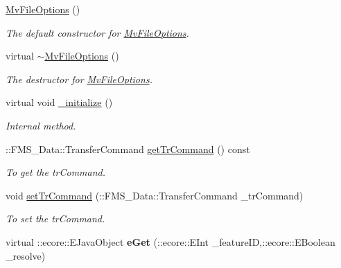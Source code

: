 \begin{DoxyCompactItemize}
\item 
\hypertarget{classFMS__Data_1_1MvFileOptions_a2418ac363bd5649b573cc92597c03cc5}{
\hyperlink{classFMS__Data_1_1MvFileOptions_a2418ac363bd5649b573cc92597c03cc5}{MvFileOptions} ()}
\label{classFMS__Data_1_1MvFileOptions_a2418ac363bd5649b573cc92597c03cc5}

\begin{DoxyCompactList}\small\item\em The default constructor for \hyperlink{classFMS__Data_1_1MvFileOptions}{MvFileOptions}. \item\end{DoxyCompactList}\item 
\hypertarget{classFMS__Data_1_1MvFileOptions_a7e2f6250a0c32a31f6e522e785bd1e5e}{
virtual \hyperlink{classFMS__Data_1_1MvFileOptions_a7e2f6250a0c32a31f6e522e785bd1e5e}{$\sim$MvFileOptions} ()}
\label{classFMS__Data_1_1MvFileOptions_a7e2f6250a0c32a31f6e522e785bd1e5e}

\begin{DoxyCompactList}\small\item\em The destructor for \hyperlink{classFMS__Data_1_1MvFileOptions}{MvFileOptions}. \item\end{DoxyCompactList}\item 
\hypertarget{classFMS__Data_1_1MvFileOptions_a0aee099d31f86c16911b06b20671326b}{
virtual void \hyperlink{classFMS__Data_1_1MvFileOptions_a0aee099d31f86c16911b06b20671326b}{\_\-initialize} ()}
\label{classFMS__Data_1_1MvFileOptions_a0aee099d31f86c16911b06b20671326b}

\begin{DoxyCompactList}\small\item\em Internal method. \item\end{DoxyCompactList}\item 
::FMS\_\-Data::TransferCommand \hyperlink{classFMS__Data_1_1MvFileOptions_a000cae44e75d374994afd9522d06db7a}{getTrCommand} () const 
\begin{DoxyCompactList}\small\item\em To get the trCommand. \item\end{DoxyCompactList}\item 
void \hyperlink{classFMS__Data_1_1MvFileOptions_ac46c0b66b2f78ee5fc51177b22e59c27}{setTrCommand} (::FMS\_\-Data::TransferCommand \_\-trCommand)
\begin{DoxyCompactList}\small\item\em To set the trCommand. \item\end{DoxyCompactList}\item 
\hypertarget{classFMS__Data_1_1MvFileOptions_a8b85f7068838c6d307e1d516cf3be7d0}{
virtual ::ecore::EJavaObject {\bfseries eGet} (::ecore::EInt \_\-featureID,::ecore::EBoolean \_\-resolve)}
\label{classFMS__Data_1_1MvFileOptions_a8b85f7068838c6d307e1d516cf3be7d0}


\end{DoxyCompactItemize}

